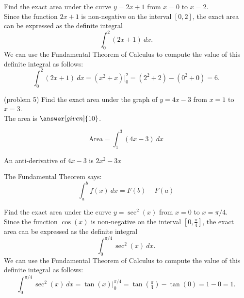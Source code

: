 \documentclass{ximera}
\begin{document}
\begin{example}[example 5]
Find the exact area under the curve $y = 2x+1$ from $x=0$ to $x= 2$.\\
Since the function $2x+1$ is non-negative on the interval $[0, 2]$, the exact area can be expressed as the definite integral
\[\int_0^2 (2x+1) \ dx.\]
We can use the Fundamental Theorem of Calculus to compute the value of this definite integral as follows:
\[
\int_0^2 (2x+ 1) \ dx = (x^2 + x) \Big|_0^2 = (2^2 + 2) - (0^2 + 0) = 6.
\]



\end{example}


\begin{problem}(problem 5)
Find the exact area under the graph of $y = 4x-3$ from $x = 1$ to $x = 3$.\\
The area is $\answer[given]{10}$.
 \begin{hint}
  \[
  \text{Area} =  \int_1^3 (4x - 3) \ dx
  \]
 \end{hint}
    \begin{hint}
      An anti-derivative of $4x-3$ is $2x^2 - 3x$
    \end{hint}
    \begin{hint}
      The Fundamental Theorem says:
      \[
      \int_a^b f(x) \ dx = F(b) - F(a)
      \]
    \end{hint}    
		
		
\end{problem}


\begin{example}[example 6]
Find the exact area under the curve $y = \sec^2(x)$ from $x=0$ to $x= \pi/4$.\\
Since the function $\cos(x)$ is non-negative on the interval $[0, \frac{\pi}{4}]$, the exact area can be expressed as the definite integral
\[\int_0^{\pi/4} \sec^2(x) \ dx.\]
We can use the Fundamental Theorem of Calculus to compute the value of this definite integral as follows:
\[
\int_0^{\pi/4} \sec^2(x) \ dx = \tan(x) \Big|_0^{\pi/4} = \tan(\tfrac{\pi}{4}) - \tan(0) = 1-0 =1.
\] 


\begin{image}
\end{image}




\end{example}
\end{document}
